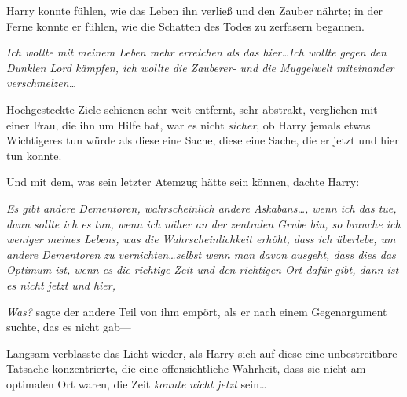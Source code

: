 Harry konnte fühlen, wie das Leben ihn verließ und den Zauber nährte; in der Ferne konnte er fühlen, wie die Schatten des Todes zu zerfasern begannen.

\emph{Ich wollte mit meinem Leben mehr erreichen als das hier…Ich wollte gegen den Dunklen Lord kämpfen, ich wollte die Zauberer- und die Muggelwelt miteinander verschmelzen…}

Hochgesteckte Ziele schienen sehr weit entfernt, sehr abstrakt, verglichen mit einer Frau, die ihn um Hilfe bat, war es nicht \emph{sicher}, ob Harry jemals etwas Wichtigeres tun würde als diese eine Sache, diese eine Sache, die er jetzt und hier tun konnte.

Und mit dem, was sein letzter Atemzug hätte sein können, dachte Harry:

\emph{Es gibt andere Dementoren, wahrscheinlich andere Askabans…, wenn ich das tue, dann sollte ich es tun, wenn ich näher an der zentralen Grube bin, so brauche ich weniger meines Lebens, was die Wahrscheinlichkeit erhöht, dass ich überlebe, um andere Dementoren zu vernichten…selbst wenn man davon ausgeht, dass dies das Optimum ist, wenn es die richtige Zeit und den richtigen Ort dafür gibt, dann ist es nicht jetzt und hier, }

\emph{Was?} sagte der andere Teil von ihm empört, als er nach einem Gegenargument suchte, das es nicht gab—

Langsam verblasste das Licht wieder, als Harry sich auf diese eine unbestreitbare Tatsache konzentrierte, die eine offensichtliche Wahrheit, dass sie nicht am optimalen Ort waren, die Zeit \emph{konnte} \emph{nicht} \emph{jetzt} sein…

